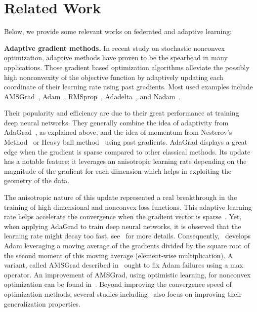 \documentclass[twoside]{article}
\begin{document}
\section{Related Work}\label{sec:related}

Below, we provide some relevant works on federated and adaptive learning:


\vspace{0.1in}
\noindent\textbf{Adaptive gradient methods.}
In recent study on stochastic nonconvex optimization, adaptive methods have proven to be the spearhead in many applications.
Those gradient based optimization algorithms alleviate the possibly high nonconvexity of the objective function by adaptively updating each coordinate of their learning rate using past gradients. Most used examples include AMSGrad~\citep{reddi2019convergence}, Adam~\citep{KB15}, RMSprop~\citep{TH12}, Adadelta~\citep{Z12}, and Nadam~\citep{D16}.

Their popularity and efficiency are due to their great performance at training deep neural networks.
They generally combine the idea of adaptivity from AdaGrad~\citep{DHS11,mcmahan2010adaptive}, as explained above, and the idea of momentum from Nesterov's Method~\citep{N04} or Heavy ball method~\citep{P64} using past gradients.
AdaGrad displays a great edge when the gradient is sparse compared to other classical methods.
Its update has a notable feature: it leverages an anisotropic learning rate depending on the magnitude of the gradient for each dimension which helps in exploiting the geometry of the data. 

The anisotropic nature of this update represented a real breakthrough in the training of high dimensional and nonconvex loss functions.
This adaptive learning rate helps accelerate the convergence when the gradient vector is sparse~\citep{DHS11}. Yet, when applying AdaGrad to train deep neural networks, it is observed that the learning rate might decay too fast, see~\citet{KB15} for more details.
Consequently,~\cite{KB15} develops Adam leveraging a moving average of the gradients divided by the square root of the second moment of this moving average (element-wise multiplication).
A variant, called AMSGrad described in~\citet{reddi2019convergence} ought to fix Adam failures using a max operator.
An improvement of AMSGrad, using optimistic learning, for nonconvex optimization can be found in~\citet{wang2019optimistic}.
Beyond improving the convergence speed of optimization methods, several studies including~\citet{zhou2020towards} also focus on improving their generalization properties.
\end{document}
